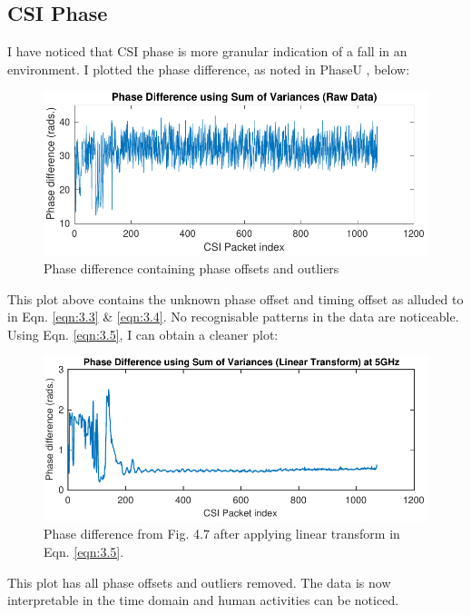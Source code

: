 \subsection{CSI Phase}
I have noticed that CSI phase is more granular indication of a fall in an environment. I plotted the phase difference, as noted in PhaseU \citep{PhaseU}, below:
\begin{figure}[H]
    \centering
    \includegraphics[scale=0.75]{Figures/uncleanPhaseFallCLASSROOM.pdf}
    \caption{Phase difference containing phase offsets and outliers}
    \label{fig:uncleanPhaseDiff}
\end{figure}
This plot above contains the unknown phase offset and timing offset as alluded to in Eqn. \ref{eqn:3.3} \& \ref{eqn:3.4}. No recognisable patterns in the data are noticeable. Using Eqn. \ref{eqn:3.5}, I can obtain a cleaner plot:
\begin{figure}[H]
    \centering
    \includegraphics[scale=0.75]{Figures/cleanPhaseFallCLASSROOM.pdf}
    \caption{Phase difference from Fig. 4.7 after applying linear transform in Eqn. \ref{eqn:3.5}.}
    \label{fig:cleanerPhaseDiff}
\end{figure}
This plot has all phase offsets and outliers removed. The data is now interpretable in the time domain and human activities can be noticed. 
